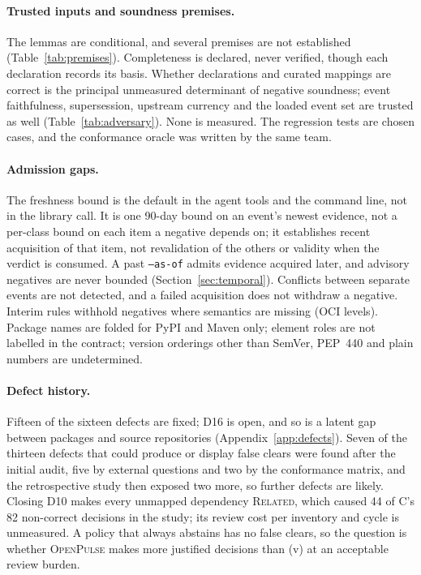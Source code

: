 \documentclass[11pt,a4paper]{article}
\newcommand{\op}{\textsc{OpenPulse}}
\newcommand{\code}[1]{\texttt{#1}}
\begin{document}
\paragraph{Trusted inputs and soundness premises.} The lemmas are
conditional, and several premises are not established
(Table~\ref{tab:premises}). Completeness is declared, never verified,
though each declaration records its basis. Whether declarations and
curated mappings are correct is the principal unmeasured determinant
of negative soundness; event faithfulness, supersession, upstream
currency and the loaded event set are trusted as well
(Table~\ref{tab:adversary}). None is measured. The regression tests
are chosen cases, and the conformance oracle was written by the same
team.

\paragraph{Admission gaps.} The freshness bound is the default in the
agent tools and the command line, not in the library call. It is one
90-day bound on an event's newest evidence, not a per-class bound on
each item a negative depends on; it establishes recent acquisition of
that item, not revalidation of the others or validity when the verdict
is consumed. A past \code{--as-of} admits evidence acquired later, and
advisory negatives are never bounded (Section~\ref{sec:temporal}).
Conflicts between separate events are not detected, and a failed
acquisition does not withdraw a negative. Interim rules withhold
negatives where semantics are missing (OCI levels). Package names are
folded for PyPI and Maven only; element roles are not labelled in the
contract; version orderings other than SemVer, PEP~440 and plain
numbers are undetermined.

\paragraph{Defect history.} Fifteen of the sixteen defects are fixed;
D16 is open, and so is a latent gap between packages and source
repositories (Appendix~\ref{app:defects}). Seven of the thirteen
defects that could produce or display false clears were found after the
initial audit, five by external questions and two by the conformance
matrix, and the retrospective study then exposed two more, so further
defects are likely. Closing D10 makes every unmapped dependency
\textsc{Related}, which caused 44 of C's 82 non-correct decisions in
the study; its review cost per inventory and cycle is unmeasured. A
policy that always abstains has no false clears, so the question is
whether \op{} makes more justified decisions than (v) at an acceptable
review burden.
\end{document}
